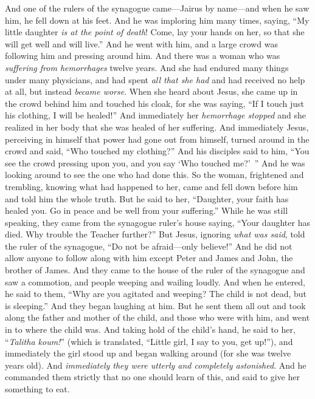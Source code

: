 \begin{biblechapter}
\verse And one of the rulers of the synagogue came—Jairus by name—and when he saw him, he fell down at his feet.
\verse And he was imploring him many times, saying, “My little daughter \textit{is at the point of death}! Come, lay your hands on her, so that she will get well and will live.”
\verse And he went with him, and a large crowd was following him and pressing around him.
\verse And there was a woman who was \textit{suffering from hemorrhages} twelve years.
\verse And she had endured many things under many physicians, and had spent \textit{all that she had} and had received no help at all, but instead \textit{became worse}.
\verse When she heard about Jesus, she came up in the crowd behind him and touched his cloak,
\verse for she was saying, “If I touch just his clothing, I will be healed!”
\verse And immediately her \textit{hemorrhage stopped} and she realized in her body that she was healed of her suffering.
\verse And immediately Jesus, perceiving in himself that power had gone out from himself, turned around in the crowd and said, “Who touched my clothing?”
\verse And his disciples said to him, “You see the crowd pressing upon you, and you say ‘Who touched me?’ ”
\verse And he was looking around to see the one who had done this.
\verse So the woman, frightened and trembling, knowing what had happened to her, came and fell down before him and told him the whole truth.
\verse But he said to her, “Daughter, your faith has healed you. Go in peace and be well from your suffering.”
\verse While he was still speaking, they came from the synagogue ruler’s house saying, “Your daughter has died. Why trouble the Teacher further?”
\verse But Jesus, ignoring \textit{what was said}, told the ruler of the synagogue, “Do not be afraid—only believe!”
\verse And he did not allow anyone to follow along with him except Peter and James and John, the brother of James.
\verse And they came to the house of the ruler of the synagogue and saw a commotion, and people weeping and wailing loudly.
\verse And when he entered, he said to them, “Why are you agitated and weeping? The child is not dead, but is sleeping.”
\verse And they began laughing at him. But he sent them all out and took along the father and mother of the child, and those who were with him, and went in to where the child was.
\verse And taking hold of the child’s hand, he said to her, “\textit{Talitha koum!}” (which is translated, “Little girl, I say to you, get up!”),
\verse and immediately the girl stood up and began walking around (for she was twelve years old). And \textit{immediately they were utterly and completely astonished}.
\verse And he commanded them strictly that no one should learn of this, and said to give her something to eat.
\end{biblechapter}

